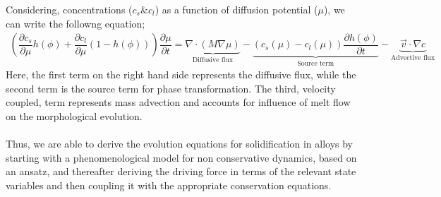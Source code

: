 \documentclass[12pt,a4paper]{report}
\begin{document}
%
Considering, concentrations ($c_s \& c_l$) as a function of diffusion potential ($\mu$), we can write the followng equation;
\\
 \begin{align}
 \left(\dfrac{\partial c_s}{\partial \mu}h\left(\phi\right) + \dfrac{\partial c_l}{\partial \mu}(1-h\left(\phi\right))\right)
 \dfrac{\partial \mu}{\partial t} = \underbrace{\nabla \cdot \left(M\nabla\mu\right)}_{\text{Diffusive flux}} 
 - \underbrace{\left(c_s\left(\mu\right) - c_l \left(\mu\right)\right)\dfrac{\partial h\left(\phi\right)}{\partial t}}_{\text{Source term}} - \underbrace{ \vec{v}\cdot\nabla c}_{\text{Advective flux}}
 \label{Mass-conservation-alloys}
 \end{align}
 Here, the first term on the right hand side represents the diffusive flux, while the second term is the source term for phase transformation. The third, velocity coupled, term represents mass advection and accounts for influence of melt flow on the morphological  evolution.\\
\\
 Thus, we are able to derive the evolution equations for solidification in alloys by starting 
 with a phenomenological model for non conservative dynamics, based on an ansatz, and thereafter 
 deriving the driving force in terms of the relevant state variables and then coupling it with the 
 appropriate conservation equations.
\end{document}
